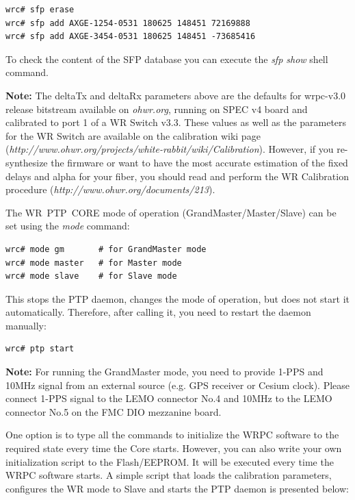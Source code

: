 \documentclass[a4paper, 12pt]{article}
\newcommand{\codeHook}[1]{\mbox{\ttfamily\MakeTextUppercase{#1}}}
\begin{document}
\begin{lstlisting}
wrc# sfp erase
wrc# sfp add AXGE-1254-0531 180625 148451 72169888
wrc# sfp add AXGE-3454-0531 180625 148451 -73685416
\end{lstlisting}

To check the content of the \codeHook{sfp} database you can execute the \textit{sfp show} shell
command.

\noindent\textbf{Note:} The deltaTx and deltaRx parameters above are the defaults for
wrpc-v3.0 release bitstream available on \textit{ohwr.org}, running on
\codeHook{spec} v4 board and calibrated to port 1 of a \codeHook{wr} Switch v3.3. These
values as well as the parameters for the \codeHook{wr} Switch are available on the
calibration wiki page
(\textit{http://www.ohwr.org/projects/white-rabbit/wiki/Calibration}). However, if
you re-synthesize the firmware or want to have the most accurate estimation of
the fixed delays and alpha for your fiber, you should read and perform the
\codeHook{wr} Calibration procedure (\textit{http://www.ohwr.org/documents/213}).

\vspace{1em}
The \codeHook{wr ptp core} mode of operation (GrandMaster/Master/Slave) can be set
using the \textit{mode} command:

\begin{lstlisting}
wrc# mode gm       # for GrandMaster mode
wrc# mode master   # for Master mode
wrc# mode slave    # for Slave mode
\end{lstlisting}

This stops the \codeHook{ptp} daemon, changes the mode of operation, but does not
start it automatically. Therefore, after calling it, you need to restart the
daemon manually:

\begin{lstlisting}
wrc# ptp start
\end{lstlisting}

\noindent\textbf{Note:} For running the GrandMaster mode, you need to provide 1-PPS and 10MHz
signal from an external source (e.g. GPS receiver or Cesium clock). Please
connect 1-PPS signal to the LEMO connector No.4 and 10MHz to the LEMO connector
No.5 on the \codeHook{fmc} \codeHook{dio} mezzanine board.

\vspace{1em}
One option is to type all the commands to initialize the \codeHook{wrpc} software to
the required state every time the Core starts. However, you can also write your
own initialization script to the Flash/EEPROM. It will be executed every time
the \codeHook{wrpc} software starts. A simple script that loads the calibration
parameters, configures the \codeHook{wr} mode to Slave and starts the \codeHook{ptp} daemon
is presented below:
\end{document}
